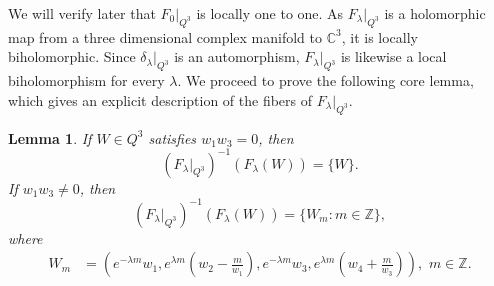 \documentclass[11pt,a4paper,reqno]{amsart}
\newtheorem{lemma}[theorem]{Lemma}
\begin{document}
We will verify later that $F_0|_{Q^3}$ is locally one to one. As $F_{\lambda}|_{Q^3}$ is a holomorphic map from a three dimensional complex manifold to ${\mathbb C}^3$, it is locally biholomorphic. Since $\delta_{\lambda}|_{Q^3}$ is an
automorphism,
$F_{\lambda}|_{Q^3}$ is likewise
a local biholomorphism
for every $\lambda$. We proceed to prove the following core lemma, which gives an explicit description of the fibers of $F_{\lambda}|_{Q^3}$.
\begin{lemma}\label{prop:fibers}
If \(W\in Q^3\) satisfies \(w_1w_3=0\), then 
\begin{equation*}
(F_{\lambda}|_{Q^3})^{-1}(F_{\lambda}(W))=\{W\}.    
\end{equation*}
If $w_1w_3\neq0$, then \begin{equation*}
(F_{\lambda}|_{Q^3})^{-1}(F_{\lambda}(W))=\{W_m:m\in\mathbb Z\},    
\end{equation*} where
\begin{equation}\label{eq:Wm}
\begin{split}
W_m&=\left(e^{-\lambda m}w_1,
 e^{\lambda m}(w_2-\frac{m}{w_1}),
 e^{-\lambda m}w_3,
 e^{\lambda m}(w_4+\frac{m}{w_3})\right),\,\,m\in\mathbb Z.\\
\end{split}
\end{equation}
\end{lemma}
\end{document}
